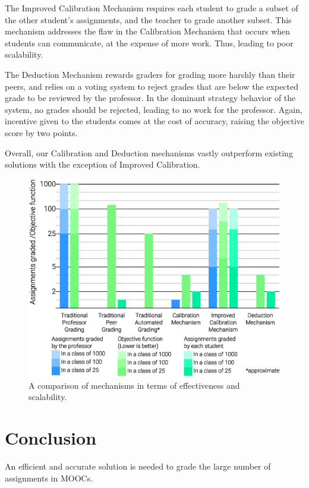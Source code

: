 \documentclass{sigchi}
\begin{document}
The Improved Calibration Mechanism requires each student to grade a subset of the other student's assignments, and the teacher to grade another subset. This mechanism addresses the flaw in the Calibration Mechanism that occurs when students can communicate, at the expense of more work. Thus, leading to poor scalability.

The Deduction Mechanism rewards graders for grading more harshly than their peers, and relies on a voting system to reject grades that are below the expected grade to be reviewed by the professor. In the dominant strategy behavior of the system, no grades should be rejected, leading to no work for the professor. Again, incentive given to the students comes at the cost of accuracy, raising the objective score by two points.

Overall, our Calibration and Deduction mechanisms vastly outperform existing solutions with the exception of Improved Calibration.

\begin{figure}[!h]
\centering
\includegraphics[width=0.9\columnwidth]{Comparison-Graph.eps}
\caption{A comparison of mechanisms in terms of effectiveness and scalability.}
\label{fig:comparison}
\end{figure}





\section{Conclusion}
An efficient and accurate solution is needed to grade the large number of assignments in MOOCs.
\end{document}
